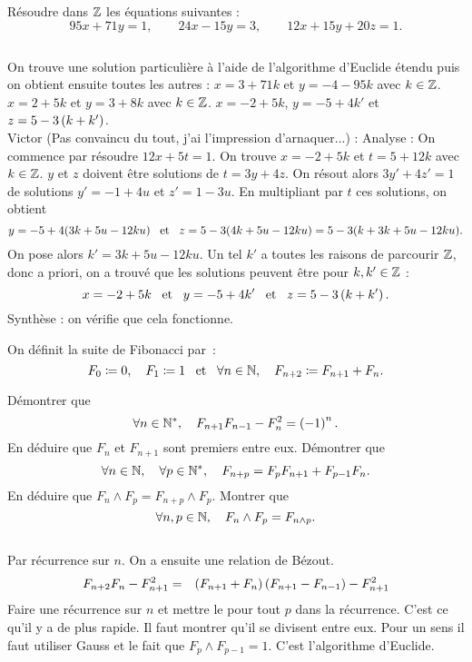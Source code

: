 \documentclass{magnolia}
\begin{document}
Résoudre dans $\mathbb{Z}$ les équations suivantes :
\[95x+71y=1, \qquad 24x-15y=3, \qquad 12x+15y+20z=1.\]
\begin{sol}
$\quad$
\begin{questions}
\question On trouve une solution particulière à l'aide de l'algorithme d'Euclide étendu puis on obtient ensuite toutes les autres : $x=3+71k$ et $y=-4-95k$ avec $k\in\mathbb{Z}$.
\question $x=2+5k$ et $y=3+8k$ avec $k\in\mathbb{Z}$.
\question $x=-2+5k$, $y=-5+4k'$ et $z=5-3\left(k+k'\right)$.\\
Victor (Pas convaincu du tout, j'ai l'impression d'arnaquer...) : Analyse : On commence par résoudre $12x+5t=1$. On trouve $x=-2+5k$ et $t=5+12k$ avec $k\in\mathbb{Z}$. $y$ et $z$ doivent être solutions de $t=3y+4z$. On résout alors $3y'+4z'=1$ de solutions $y'=-1+4u$ et $z'=1-3u$. En multipliant par $t$ ces solutions, on obtient $$y=-5+4(3k+5u-12ku) \quad\!\text{et}\quad\! z=5-3(4k+5u-12ku)=5-3(k+3k+5u-12ku).$$ On pose alors $k'=3k+5u-12ku$. Un tel $k'$ a toutes les raisons de parcourir $\mathbb{Z}$, donc a priori, on a trouvé que les solutions peuvent être pour $k,k'\in \mathbb{Z}$ :
$$x=-2+5k \quad\!\text{et}\quad\! y=-5+4k' \quad\!\text{et}\quad\! z=5-3\left(k+k'\right).$$
Synthèse : on vérifie que cela fonctionne.
\end{questions}
\end{sol}



On définit la suite de Fibonacci par~:
\[F_0\coloneqq 0, \quad F_1\coloneqq 1 \quad\!\text{et}\quad\! \forall n\in\mathbb{N} ,\quad F_{n+2}\coloneqq F_{n+1}+F_n.\]
\begin{questions}
\question Démontrer que
  \[\forall n\in{\mathbb{N}^*} ,\quad F_{n+1}F_{n-1}-F_n^2=\left(-1\right)^n.\]
  En déduire que $F_n$ et $F_{n+1}$ sont premiers entre eux.
\question Démontrer que
  \[\forall n\in\mathbb{N} ,\quad \forall p\in{\mathbb{N}^*} ,\quad
    F_{n+p}=F_p F_{n+1}+F_{p-1}F_n.\]
  En déduire que $F_n \wedge F_p = F_{n+p}\wedge F_p$.
\question Montrer que
  \[\forall n,p\in\mathbb{N} ,\quad F_n \wedge F_p = F_{n\wedge p}.\]
\end{questions}
\begin{sol}
$\quad$
\begin{questions}
\question Par récurrence sur $n$. On a ensuite une relation de Bézout.
  \begin{eqnarray*}
  F_{n+2}F_n-F_{n+1}^2
  &=& \left(F_{n+1}+F_n\right)\left(F_{n+1}-F_{n-1}\right)-F_{n+1}^2
  \end{eqnarray*}
\question Faire une récurrence sur $n$ et mettre le \og pour tout $p$ \fg
  dans la récurrence. C'est ce qu'il y a de plus rapide.
  Il faut montrer qu'il se divisent entre eux. Pour un sens il faut utiliser
  Gauss et le fait que $F_p\wedge F_{p-1}=1$.
\question C'est l'algorithme d'Euclide.
\end{questions}
\end{sol}
\end{document}
